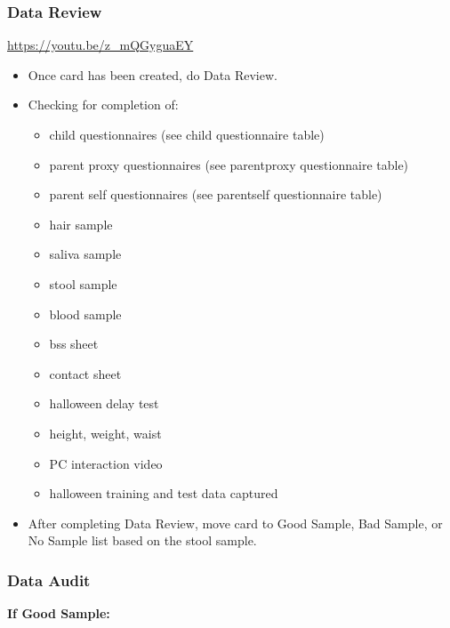 \documentclass[]{book}
\providecommand{\tightlist}{%
  \setlength{\itemsep}{0pt}\setlength{\parskip}{0pt}}
\begin{document}
\hypertarget{data-review-1}{%
\subsubsection{Data Review}\label{data-review-1}}

\url{https://youtu.be/z_mQGyguaEY}

\begin{itemize}
\item
  Once card has been created, do Data Review.
\item
  Checking for completion of:

  \begin{itemize}
  \tightlist
  \item
    child questionnaires (see child questionnaire table)
  \item
    parent proxy questionnaires (see parentproxy questionnaire table)
  \item
    parent self questionnaires (see parentself questionnaire table)
  \item
    hair sample
  \item
    saliva sample
  \item
    stool sample
  \item
    blood sample\\
  \item
    bss sheet
  \item
    contact sheet
  \item
    halloween delay test
  \item
    height, weight, waist
  \item
    PC interaction video
  \item
    halloween training and test data captured
  \end{itemize}
\item
  After completing Data Review, move card to Good Sample, Bad Sample, or No Sample list based on the stool sample.
\end{itemize}

\hypertarget{data-audit-1}{%
\subsubsection{Data Audit}\label{data-audit-1}}

\textbf{If Good Sample:}
\end{document}
